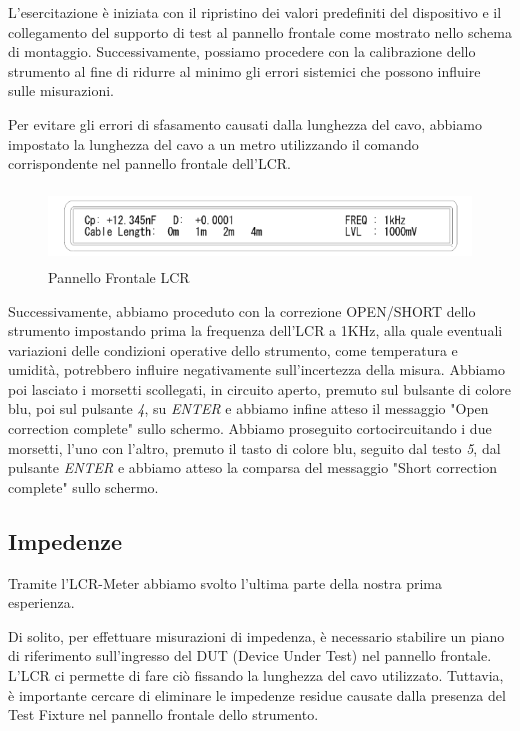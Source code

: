 L'esercitazione è iniziata con il ripristino dei valori predefiniti del dispositivo e il collegamento del supporto di test al pannello frontale come mostrato nello schema di montaggio. Successivamente, possiamo procedere con la calibrazione dello strumento al fine di ridurre al minimo gli errori sistemici che possono influire sulle misurazioni.

Per evitare gli errori di sfasamento causati dalla lunghezza del cavo, abbiamo impostato la lunghezza del cavo a un metro utilizzando il comando corrispondente nel pannello frontale dell'LCR.

\begin{figure}[ht]
    \centering
    \includegraphics[height=2cm]{media/pannello_frontale_LCR.png}
    \caption{Pannello Frontale LCR}
    \label{fig:pannello_frontale_LCR}
\end{figure}
\FloatBarrier

Successivamente, abbiamo proceduto con la correzione OPEN/SHORT dello strumento
impostando prima la frequenza dell'LCR a 1KHz, alla quale eventuali variazioni delle condizioni operative dello strumento, come temperatura e umidità, potrebbero influire negativamente sull'incertezza della misura. Abbiamo poi lasciato i morsetti scollegati, in circuito aperto, premuto sul bulsante di colore blu, poi sul pulsante \emph{4}, su \emph{ENTER} e abbiamo infine atteso il messaggio "Open correction complete" sullo schermo. Abbiamo proseguito cortocircuitando i due morsetti, l'uno con l'altro, premuto il tasto di colore blu, seguito dal testo \emph{5}, dal pulsante \emph{ENTER} e abbiamo atteso la comparsa del messaggio "Short correction complete" sullo schermo.
 



\subsection{Impedenze}
\label{sub:z}

Tramite l'LCR-Meter abbiamo svolto l'ultima parte della nostra prima esperienza.

Di solito, per effettuare misurazioni di impedenza, è necessario stabilire un piano di riferimento sull'ingresso del DUT (Device Under Test) nel pannello frontale. L'LCR ci permette di fare ciò fissando la lunghezza del cavo utilizzato. Tuttavia, è importante cercare di eliminare le impedenze residue causate dalla presenza del Test Fixture nel pannello frontale dello strumento.

